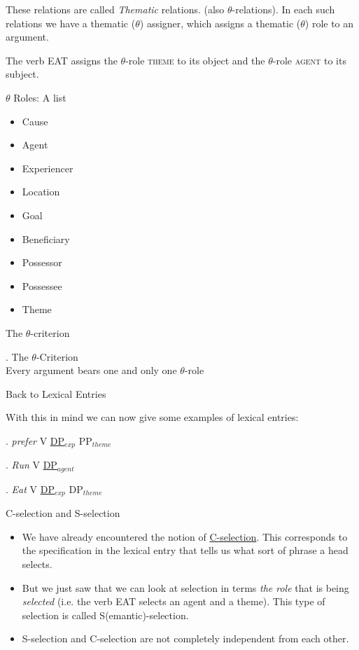 \begin{frame}
  These relations are called \textit{Thematic} relations. (also $\theta$-relations).  In each such relations we have a thematic ($\theta$) assigner, which assigns a thematic ($\theta$) role to an argument.

The verb EAT assigns the $\theta$-role \textsc{theme} to its object and the $\theta$-role \textsc{agent} to its subject.
\end{frame}

\begin{frame}
  {$\theta$ Roles:  A list}

  \begin{itemize}
  \item Cause
  \item Agent
  \item Experiencer
  \item Location
  \item Goal
  \item Beneficiary
  \item Possessor
  \item Possessee
  \item Theme
  \end{itemize}

\end{frame}

\begin{frame}
  {The $\theta$-criterion}

\ex.
The $\theta$-Criterion\\
Every argument bears one and only one $\theta$-role

\end{frame}


\begin{frame}
  {Back to Lexical Entries}

With this in mind we can now give some examples of lexical entries:

\ex.
\textit{prefer} V  \underline{DP$_{exp}$} PP$_{theme}$

\ex.
\textit{Run} V  \underline{DP$_{agent}$}

\ex.
\textit{Eat} V  \underline{DP$_{exp}$} DP$_{theme}$


\end{frame}



\begin{frame}
  {C-selection and S-selection}

\begin{itemize}
\item We have already encountered the notion of \underline{C-selection}.  This corresponds to the specification in the lexical entry that tells us what sort of phrase a head selects.  \pause
\item But we just saw that we can look at selection in terms \textit{the role} that is being \textit{selected} (i.e. the verb EAT selects an agent and a theme).  This type of selection is called S(emantic)-selection. \pause
\item S-selection and C-selection are not completely independent from each other.
\end{itemize}
\end{frame}


